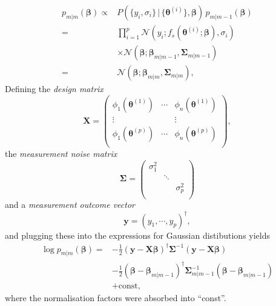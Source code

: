 \documentclass[aps,prb,twoside,superscriptaddress,longbibliography,nofootinbib,floatfix, notitlepage,twocolumn]{revtex4-1}
\renewcommand{\vec}[1]{\boldsymbol{#1}}
\begin{document}
{\begin{equation}
\begin{aligned}
  p_{m|m}(\vec\beta) \propto& P(\{y_i, \sigma_i\}\,|\, \{\vec\theta^{(i)}\}, \vec\beta)
                  \, p_{m|m-1}(\vec\beta) \\ 
                 =& \prod_{i=1}^p \mathcal{N}(y_i; f_s(\vec\theta^{(i)}; \vec\beta), \sigma_i)  \\
                    & \times 
                    \mathcal{N}(\vec\beta ; \vec\beta_{m|m-1}, \vec\Sigma_{m|m-1}) \\
                 =& \mathcal{N}(\vec\beta ; \vec\beta_{m|m}, \vec\Sigma_{m|m}),
\end{aligned}
\end{equation}
Defining the \emph{design matrix}
\begin{equation}
    \vec X = \begin{pmatrix}
        \phi_1(\vec\theta^{(1)}) & \cdots & \phi_n(\vec\theta^{(1)}) \\ 
        \vdots &   & \vdots \\ 
        \phi_1(\vec\theta^{(p)}) & \cdots & \phi_n(\vec\theta^{(p)}) \\ 
    \end{pmatrix},
\end{equation}
the \emph{measurement noise matrix}
\begin{equation}
    \vec\Sigma = \begin{pmatrix}
               \sigma_1^2 & & \\
                & \ddots & \\
                & & \sigma_p^2 \\ 
             \end{pmatrix}
\end{equation}
and a \emph{measurement outcome vector} 
\begin{equation}
    \vec y = (y_1, \cdots, y_p)^\dagger,
\end{equation}
and plugging these into the expressions for Gaussian distibutions yields
\begin{equation}
\begin{aligned}
    \log p_{m|m}(\vec\beta) =&
        - \frac{1}{2} (\vec y - \vec X \vec\beta)^\dagger \vec\Sigma^{-1} (\vec y - \vec X \vec\beta) \\ 
        &-\frac{1}{2} (\vec\beta - \vec\beta_{m|m-1})^\dagger \vec\Sigma_{m|m-1}^{-1} (\vec\beta - \vec\beta_{m|m-1}) \\
        &+ \mathrm{const},
\end{aligned}
\end{equation}
where the normalisation factors were absorbed into ``const''.
}
\end{document}

